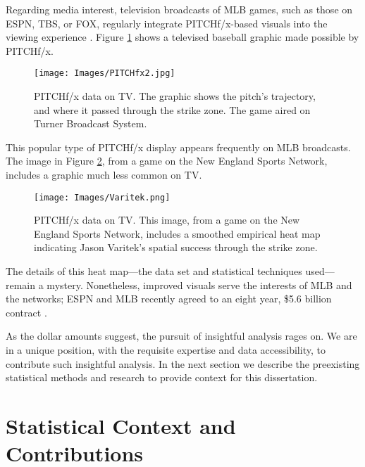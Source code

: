 Regarding media interest, television broadcasts of MLB\textsuperscript{\textregistered} games, such as those on ESPN, TBS, or FOX, regularly integrate PITCHf/x\textsuperscript{\textregistered}-based visuals into the viewing experience \citep{Cross2015}. Figure \ref{fig:fx2} shows a televised baseball graphic made possible by PITCHf/x\textsuperscript{\textregistered}.
        \begin{figure}[H]
      	\centering
      	\texttt{[image: Images/PITCHfx2.jpg]} 
      	\caption{PITCHf/x\textsuperscript{\textregistered} data on TV. The graphic shows the pitch's trajectory, and where it passed through the strike zone. The game aired on Turner Broadcast System.} %
      	\label{fig:fx2}
      	\end{figure} 
This popular type of PITCHf/x\textsuperscript{\textregistered} display appears frequently on MLB\textsuperscript{\textregistered} broadcasts. The image in Figure \ref{fig:fx3}, from a game on the New England Sports Network, includes a graphic much less common on TV.
        \begin{figure}[H]
      	\centering
      	\texttt{[image: Images/Varitek.png]} 
      	\caption{PITCHf/x\textsuperscript{\textregistered} data on TV. This image, from a game on the New England Sports Network, includes a smoothed empirical heat map indicating Jason Varitek's spatial success through the strike zone.} 
      	\label{fig:fx3}
      	\end{figure} 
The details of this heat map---the data set and statistical techniques used---remain a mystery. Nonetheless, improved visuals serve the interests of MLB\textsuperscript{\textregistered} and the networks; ESPN\textsuperscript{\textregistered} and MLB\textsuperscript{\textregistered} recently agreed to an eight year, \$5.6 billion contract \citep{Newman2012}.

As the dollar amounts suggest, the pursuit of insightful analysis rages on. We are in a unique position, with the requisite expertise and data accessibility, to contribute such insightful analysis. In the next section we describe the preexisting statistical methods and research to provide context for this dissertation.

\section{Statistical Context and Contributions}

